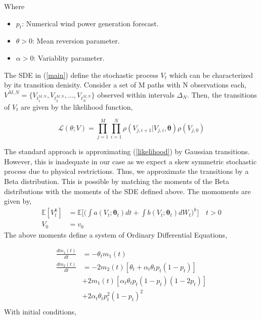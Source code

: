 \documentclass[10pt,twocolumn,letterpaper]{article}
\newcommand{\E}{\mathbb{E}}
\begin{document}
Where
\begin{itemize}
\item $p_t$: Numerical wind power generation forecast.
\item $\theta >0$: Mean reversion parameter.
\item $\alpha>0$: Variablity parameter.
\end{itemize}

The SDE in (\ref{main}) define the stochastic process $V_t$ which can be characterized by its transition denisity. Consider a set of M paths with N observations each, $ V^{M,N}=\{ V_{t_1^{M,N}} , V_{t_2^{M,N}} ,\ldots , V_{t_N^{M,N}} \}$ observed within intervals $\Delta_N$. Then, the transitions of $V_t$ are given by the likelihood function,


\begin{equation}
\mathcal{L}(\theta;V) =\prod\limits_{j=1}^M \prod\limits_{i=1}^N \rho ( {V_{j,i+1}|V_{j,i}}, \bm{\theta})  \rho (V_{j,0}) 
\label{likelihood}
\end{equation}

The standard approach is approximating (\ref{likelihood}) by Gaussian transitions. However, this is inadequate in our case as we expect a skew symmetric stochastic process due to physical restrictions. Thus, we approximate the transitions by a Beta distribution. This is possible by matching the moments of the Beta distributions with the moments of the SDE defined above. The momoments are given by, 
\begin{equation}
\begin{split}
\E [V_t^k] &=  \E \Big[ \Big( \int a(V_t; \bm{\theta}_t) dt + \int b (V_t; \bm{\theta}_t ) dW_t \Big)^k \Big] \quad t > 0 \\
V_0 & = v_0
\end{split}\label{main_V_expectations}
\end{equation}
The above moments define a system of Ordinary Differential Equations,

\begin{equation}
\begin{split}
 \frac{dm_1(t)}{dt} &=    - \theta_t m_1(t)  \\
\frac{d m_{2}(t)}{dt}&= -2m_{2}(t) [\theta_t + \alpha_t \theta_t p_t(1-p_t) ] \\
&+ 2m_{1}(t)[\alpha_t \theta_t p_t (1-p_t) (1-2p_t)] \\
&+ 2\alpha_t \theta_t p_t^2(1-p_t)^2  \\
\end{split}
\end{equation}
With initial conditions,
\end{document}
